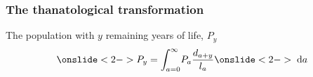 \documentclass{beamer}
\newcommand{\dd}{\; \mathrm{d}}
\begin{document}


\begin{frame}
\frametitle{The thanatological transformation}
\begin{block}{The population with $y$ remaining years of life, $P_y$}
 \begin{equation}
   \onslide<2->{P_y = \int_{a=0}^\infty} P_a \frac{d_{a+y}}{l_a}
   \onslide<2->{\dd a}
 \end{equation}
 \end{block}
\end{frame}






\end{document}
